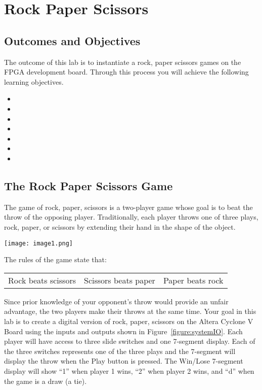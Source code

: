 \chapter{Rock Paper Scissors}
\label{RPS}
\graphicspath{ {./Lab03RockPaperScissor/Fig} }


\section{Outcomes and Objectives}

The outcome of this lab is to instantiate a rock, paper scissors games
on the FPGA development board. 
Through this process you will achieve the following
learning objectives.
\begin{itemize}
	\itemsep=0em
	\item {}
	\item {}
	\item {}
	\item {}
	\item {}
	\item {}
	\item {}
\end{itemize}

\section{The Rock Paper Scissors Game}

The game of rock, paper, scissors is a two-player game whose goal is to
beat the throw of the opposing player. Traditionally, each player throws
one of three plays, rock, paper, or scissors by extending their hand in
the shape of the object.

\texttt{[image:  image1.png]}

The rules of the game state that:

\begin{tabular}{p{4cm}p{4cm}p{4cm}}
Rock beats scissors  & Scissors beats paper & Paper beats rock \\
\end{tabular}

Since prior knowledge of your opponent's throw would provide an unfair
advantage, the two players make their throws at the same time. Your goal 
in this lab is to create a digital version of rock, paper,
scissors on the Altera Cyclone V Board using the inputs and outputs
shown in Figure~\ref{figure:systemIO}. Each player will have access to three slide switches
and one 7-segment display. Each of the three switches represents one of
the three plays and the 7-segment will display the throw when the Play
button is pressed. The Win/Lose 7-segment display will show ``1'' when
player 1 wins, ``2'' when player 2 wins, and ``d'' when the game is a
draw (a tie).

